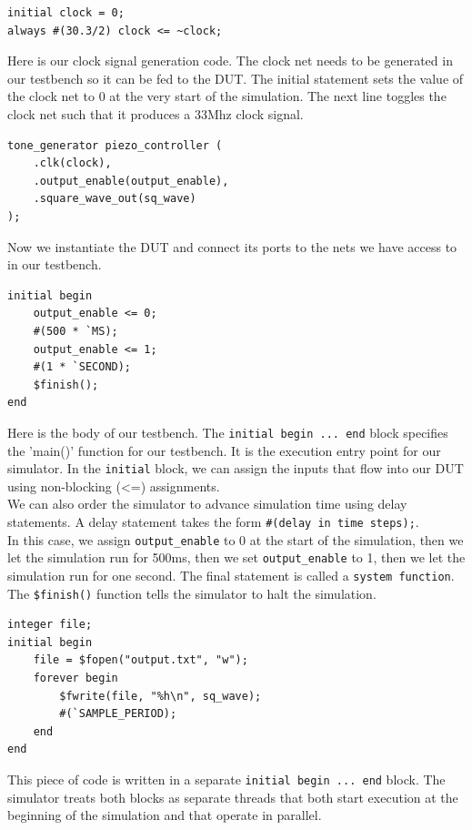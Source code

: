 \documentclass[11pt]{article}
\begin{document}
\begin{verbatim}
initial clock = 0;
always #(30.3/2) clock <= ~clock;
\end{verbatim}

Here is our clock signal generation code. The clock net needs to be generated in our testbench so it can be fed to the DUT. The initial statement sets the value of the clock net to 0 at the very start of the simulation. The next line toggles the clock net such that it produces a 33Mhz clock signal.

\begin{verbatim}
tone_generator piezo_controller (
    .clk(clock),
    .output_enable(output_enable),
    .square_wave_out(sq_wave)
);
\end{verbatim}

Now we instantiate the DUT and connect its ports to the nets we have access to in our testbench.

\begin{verbatim}
initial begin
    output_enable <= 0;
    #(500 * `MS);
    output_enable <= 1;
    #(1 * `SECOND);
    $finish();
end
\end{verbatim}

Here is the body of our testbench. The \verb|initial begin ... end| block specifies the 'main()' function for our testbench. It is the execution entry point for our simulator. In the \verb|initial| block, we can assign the inputs that flow into our DUT using non-blocking (<=) assignments. \\

We can also order the simulator to advance simulation time using delay statements. A delay statement takes the form \verb|#(delay in time steps);|.\\

In this case, we assign \verb|output_enable| to 0 at the start of the simulation, then we let the simulation run for 500ms, then we set \verb|output_enable| to 1, then we let the simulation run for one second. The final statement is called a \verb|system function|. The \verb|$finish()| function tells the simulator to halt the simulation.

\begin{verbatim}
integer file;
initial begin
	file = $fopen("output.txt", "w");
	forever begin
		$fwrite(file, "%h\n", sq_wave);
		#(`SAMPLE_PERIOD);
	end
end
\end{verbatim}

This piece of code is written in a separate \verb|initial begin ... end| block. The simulator treats both blocks as separate threads that both start execution at the beginning of the simulation and that operate in parallel.\\
\end{document}

